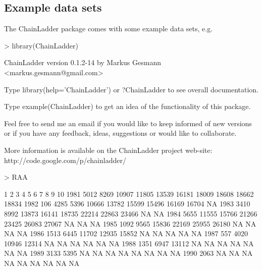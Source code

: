\documentclass[a4paper]{article}
\begin{document}
\subsection{Example data sets }
The ChainLadder package comes with some example data sets, e.g.
\begin{Schunk}
\begin{Sinput}
> library(ChainLadder)
\end{Sinput}
\begin{Soutput}
ChainLadder version 0.1.2-14 by Markus Gesmann <markus.gesmann@gmail.com>

Type library(help='ChainLadder') or ?ChainLadder
to see overall documentation.

Type example(ChainLadder) to get an idea of the functionality of this package.

Feel free to send me an email if you would like to keep informed of
new versions or if you have any feedback, ideas, suggestions or would
like to collaborate.

More information is available on the ChainLadder project web-site:
http://code.google.com/p/chainladder/
\end{Soutput}
\begin{Sinput}
> RAA
\end{Sinput}
\begin{Soutput}
        1     2     3     4     5     6     7     8     9    10
1981 5012  8269 10907 11805 13539 16181 18009 18608 18662 18834
1982  106  4285  5396 10666 13782 15599 15496 16169 16704    NA
1983 3410  8992 13873 16141 18735 22214 22863 23466    NA    NA
1984 5655 11555 15766 21266 23425 26083 27067    NA    NA    NA
1985 1092  9565 15836 22169 25955 26180    NA    NA    NA    NA
1986 1513  6445 11702 12935 15852    NA    NA    NA    NA    NA
1987  557  4020 10946 12314    NA    NA    NA    NA    NA    NA
1988 1351  6947 13112    NA    NA    NA    NA    NA    NA    NA
1989 3133  5395    NA    NA    NA    NA    NA    NA    NA    NA
1990 2063    NA    NA    NA    NA    NA    NA    NA    NA    NA
\end{Soutput}
\end{Schunk}
\end{document}

